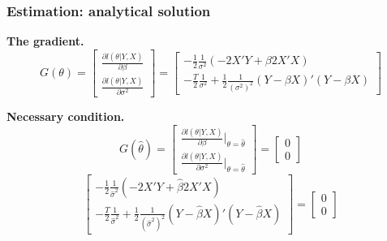 \documentclass[notes,blackandwhite,mathsans]{beamer}
\begin{document}
\begin{frame}
\frametitle{Estimation: analytical solution}

\textbf{The gradient.}
\begin{equation*}
G(\theta) = \begin{bmatrix} \frac{\partial l\left(\theta|Y,X\right) }{\partial\beta} \\ \frac{\partial l\left(\theta|Y,X\right) }{\partial\sigma^2} \end{bmatrix}
= \begin{bmatrix} 
-\frac{1}{2}\frac{1}{\sigma^2}\left( -2X'Y + \beta 2X'X \right) \\
-\frac{T}{2}\frac{1}{\sigma^2} + \frac{1}{2}\frac{1}{\left(\sigma^2\right)^2}(Y-\beta X)'(Y-\beta X)
 \end{bmatrix}
\end{equation*}

\bigskip\textbf{Necessary condition.}
\begin{equation*}
G(\hat\theta) = \begin{bmatrix} \frac{\partial l\left(\theta|Y,X\right) }{\partial\beta}\big|_{\theta=\hat\theta} \\ \frac{\partial l\left(\theta|Y,X\right) }{\partial\sigma^2}\big|_{\theta=\hat\theta} \end{bmatrix} = \begin{bmatrix} 0\\0\end{bmatrix}
\end{equation*}
\begin{equation*}
\begin{bmatrix} 
-\frac{1}{2}\frac{1}{\hat\sigma^2}\left( -2X'Y + \hat\beta 2X'X \right) \\
-\frac{T}{2}\frac{1}{\hat\sigma^2} + \frac{1}{2}\frac{1}{\left(\hat\sigma^2\right)^2}(Y-\hat\beta X)'(Y-\hat\beta X)
 \end{bmatrix} = \begin{bmatrix} 0\\0\end{bmatrix}
\end{equation*}

\end{frame}
\end{document}
